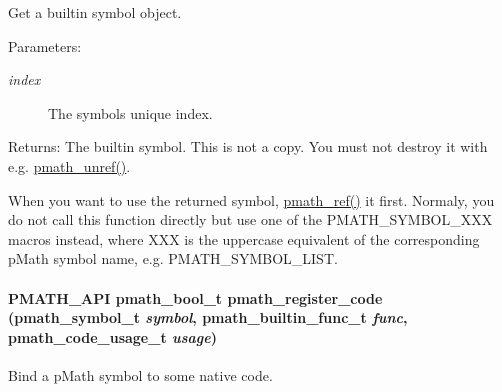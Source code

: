 Get a builtin symbol object. 

\begin{Desc}
\item[Parameters:]
\begin{description}
\item[{\em index}]The symbols unique index. \end{description}
\end{Desc}
\begin{Desc}
\item[Returns:]The builtin symbol. This is not a copy. You must not destroy it with e.g. \hyperlink{classpmath__t_54e905402c38940687033b87eb8c6c9f}{pmath\_\-unref()}.\end{Desc}
When you want to use the returned symbol, \hyperlink{classpmath__t_42cd678b691046a58dede518315c6b13}{pmath\_\-ref()} it first. Normaly, you do not call this function directly but use one of the PMATH\_\-SYMBOL\_\-XXX macros instead, where XXX is the uppercase equivalent of the corresponding pMath symbol name, e.g. PMATH\_\-SYMBOL\_\-LIST. \hypertarget{group__symbols_gd02a05fa96992d137b450627486ec0b5}{
\paragraph[{pmath\_\-register\_\-code}]{\setlength{\rightskip}{0pt plus 5cm}PMATH\_\-API {\bf pmath\_\-bool\_\-t} pmath\_\-register\_\-code ({\bf pmath\_\-symbol\_\-t} {\em symbol}, \/  {\bf pmath\_\-builtin\_\-func\_\-t} {\em func}, \/  {\bf pmath\_\-code\_\-usage\_\-t} {\em usage})}\hfill}
\label{group__symbols_gd02a05fa96992d137b450627486ec0b5}


Bind a pMath symbol to some native code. 

